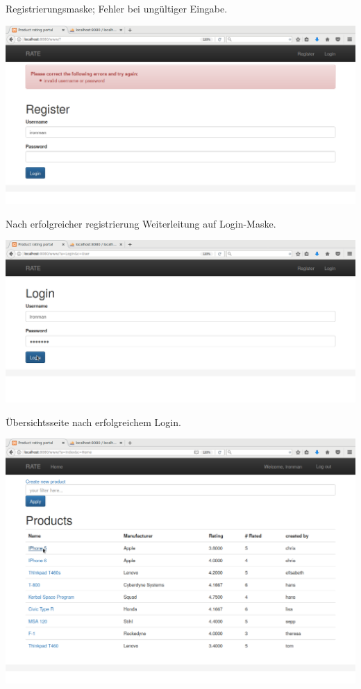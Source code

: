 \documentclass{article}
\begin{document}
Registrierungsmaske; Fehler bei ungültiger Eingabe.

\includegraphics[width=1.0\textwidth]{2.png}

Nach erfolgreicher registrierung Weiterleitung auf Login-Maske.

\includegraphics[width=1.0\textwidth]{3.png}

Übersichtsseite nach erfolgreichem Login.

\includegraphics[width=1.0\textwidth]{4.png}
\end{document}
